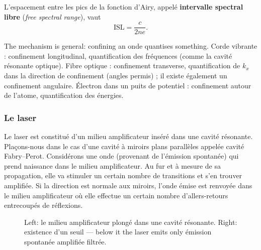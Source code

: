 \begin{definition}
  L'espacement entre les pics de la fonction d'Airy, appelé
  \textbf{intervalle spectral libre} (\textit{free spectral range}), vaut
  \[\mathrm{ISL}=\frac{c}{2ne}.\]
\end{definition}

\begin{remark}
  The mechanism is general: confining an onde quantises something. Corde
  vibrante : confinement longitudinal, quantification des fréquences (comme la
  cavité résonante optique). Fibre optique : confinement transverse,
  quantification de $k_x$ dans la direction de confinement (angles permis) ;
  il existe également un confinement angulaire. Électron dans un puits de
  potentiel : confinement autour de l'atome, quantification des énergies.
\end{remark}

\subsubsection{Le laser}
Le laser est constitué d'un milieu amplificateur inséré dans une cavité
résonante. Plaçons-nous dans le cas d'une cavité à miroirs plans parallèles
appelée cavité Fabry--Perot. Considérons une onde (provenant de l'émission
spontanée) qui prend naissance dans le milieu amplificateur. Au fur et à mesure
de sa propagation, elle va stimuler un certain nombre de transitions et s'en
trouver amplifiée. Si la direction est normale aux miroirs, l'onde émise est
renvoyée dans le milieu amplificateur où elle effectue un certain nombre
d'allers-retours entrecoupés de réflexions.

\begin{figure}[h!]
  \centering
  \caption*{\footnotesize Left: le milieu amplificateur plongé dans une cavité
  résonante. Right: existence d'un seuil --- below it the laser emits only
  émission spontanée amplifiée filtrée.}
\end{figure}

